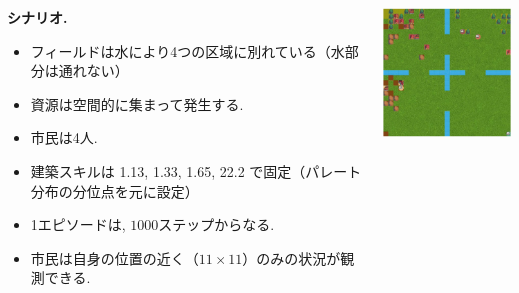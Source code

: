 \documentclass[unicode,aspectratio=169,11pt]{beamer}
\begin{document}
\begin{frame}{}{}
\begin{columns}[t]
    \begin{column}{0.6\textwidth}
        {\bf シナリオ.}
        \begin{itemize}
            \item フィールドは水により4つの区域に別れている（水部分は通れない）
            \item 資源は空間的に集まって発生する.
            \item 市民は4人.
            \item 建築スキルは 1.13, 1.33, 1.65, 22.2 で固定（パレート分布の分位点を元に設定）
            \item 1エピソードは, $1000$ステップからなる.
            \item 市民は自身の位置の近く（$11\times11$）のみの状況が観測できる.
        \end{itemize}
    \end{column}
    \begin{column}{0.4\textwidth}
        \begin{center}
            \includegraphics[width=5cm]{figure1.png}
        \end{center}
    \end{column}
\end{columns}
\end{frame}
\end{document}
